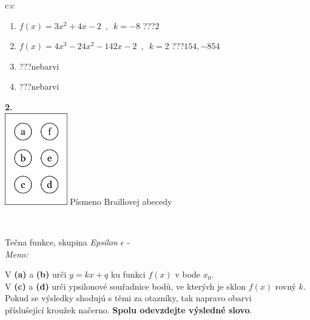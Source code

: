 \documentclass[10pt]{report}
\begin{document}
\begin{tabular}{c:c}
\begin{minipage}[c][104.5mm][t]{0.5\linewidth}
\begin{center}
\begin{minipage}{0.79\linewidth}
\begin{center}
\begin{varwidth}{\linewidth}
\begin{enumerate}
\item $f(x)=3x^2+4x-2\enspace , \enspace k=-8$\quad \dotfill\; ???\;\dotfill \quad $2$
\item $f(x)=4x^3-24x^2-142x-2\enspace , \enspace k=2$\quad \dotfill\; ???\;\dotfill \quad $154 , -854$
\item \quad \dotfill\; ???\;\dotfill \quad nebarvi
\item \quad \dotfill\; ???\;\dotfill \quad nebarvi
\end{enumerate}
\end{varwidth}
\end{center}
\end{minipage}
\begin{minipage}{0.20\linewidth}
\begin{center}
{\Huge\bfseries 2.} \\[2mm]
\includegraphics[height=40mm]{../images/braille.png}
{\small Písmeno Braillovej abecedy}
\end{center}
\end{minipage}
\end{center}
\end{minipage}
\\ \hdashline
\begin{minipage}[c][104.5mm][t]{0.5\linewidth}
\begin{center}
\vspace{7mm}
{\huge Tečna funkce, skupina \textit{Epsilon $\epsilon$} -}\\[5mm]
\textit{Meno:}\phantom{xxxxxxxxxxxxxxxxxxxxxxxxxxxxxxxxxxxxxxxxxxxxxxxxxxxxxxxxxxxxxxxxx}\\[5mm]
\begin{minipage}{0.95\linewidth}
\begin{center}
V \textbf{(a)} a \textbf{(b)} urči  $y = kx + q$ ku funkci $f(x)$ v bode $x_0$.\\V \textbf{(c)} a \textbf{(d)} urči ypsilonové souřadnice bodů, ve kterých je sklon $f(x)$ rovný $k$.\\Pokud se výsledky shodujú s těmi za otazníky, tak napravo obarvi\\příslušející kroužek načerno. \textbf{Spolu odevzdejte výsledné slovo}.

\end{center}
\end{minipage}
\end{center}
\end{minipage}
\end{tabular}
\end{document}
